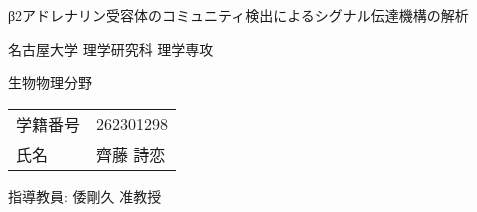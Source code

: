 \begin{titlepage}
    \fontsize{30pt}{30pt} \selectfont
    
    \centering
    β2アドレナリン受容体のコミュニティ検出によるシグナル伝達機構の解析
    \vspace{15pt}

    名古屋大学 理学研究科 理学専攻
    \vspace{20pt}

    生物物理分野
    \vspace{45pt}

    \begin{tabular}{ll}
        学籍番号 & 262301298 \\
        氏名   & 齊藤 詩恋 \\
    \end{tabular}

    指導教員: 倭剛久 准教授
    \vspace{45pt}

    \normalsize

\end{titlepage}